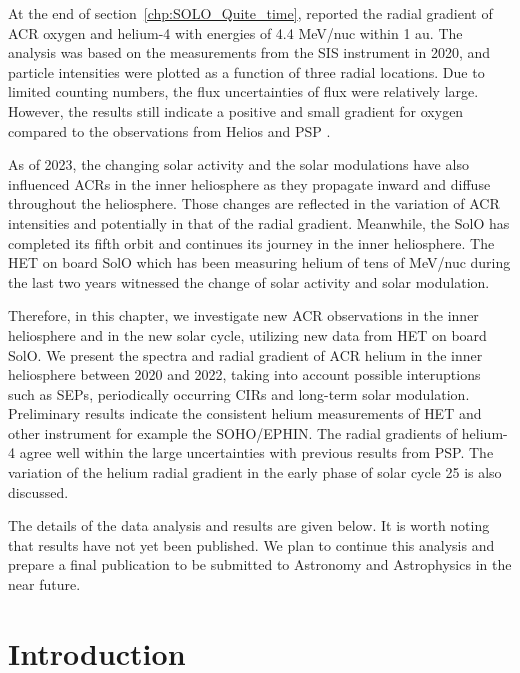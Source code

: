 

At the end of section~\ref{chp:SOLO_Quite_time}, \citet{Mason-2021-SolOQuietTime} reported the radial gradient of \ac{ACR} oxygen and helium-4 with energies of 4.4 MeV/nuc within 1 au. The analysis was based on the measurements from the \ac{SIS} instrument in 2020, and particle intensities were plotted as a function of three radial locations. Due to limited counting numbers, the flux uncertainties of flux were relatively large. However, the results still indicate a positive and small gradient for oxygen compared to the observations from Helios and \ac{PSP} \citep{Marquardt2018AA,Rankin2021ApJ}.

As of 2023, the changing solar activity and the solar modulations have also influenced \acp{ACR} in the inner heliosphere as they propagate inward and diffuse throughout the heliosphere. Those changes are reflected in the variation of \ac{ACR} intensities and potentially in that of the radial gradient.
Meanwhile, the \ac{SolO} has completed its fifth orbit and continues its journey in the inner heliosphere. The \ac{HET} on board \ac{SolO} which has been measuring helium of tens of MeV/nuc during the last two years witnessed the change of solar activity and solar modulation.

Therefore, in this chapter, we investigate new \ac{ACR} observations in the inner heliosphere and in the new solar cycle, utilizing new data from \ac{HET} on board \ac{SolO}. We present the spectra and radial gradient of \ac{ACR} helium in the inner heliosphere between 2020 and 2022, taking into account possible interuptions such as \acp{SEP}, periodically occurring \acp{CIR} and long-term solar modulation.
Preliminary results indicate the consistent helium measurements of \ac{HET} and other instrument for example the \ac{SOHO}/\ac{EPHIN}. The radial gradients of helium-4 agree well within the large uncertainties with previous results from \ac{PSP}. The variation of the helium radial gradient in the early phase of solar cycle 25 is also discussed.

The details of the data analysis and results are given below. It is worth noting that results have not yet been published. We plan to continue this analysis and prepare a final publication to be submitted to Astronomy and Astrophysics in the near future.


\section{Introduction}

